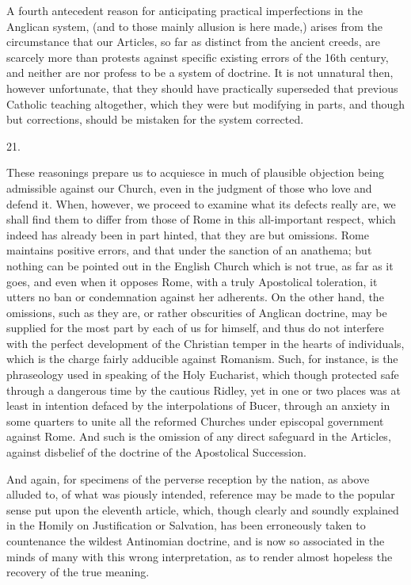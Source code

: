 A fourth antecedent reason for anticipating
practical imperfections in the Anglican system, (and to those mainly
allusion is here made,) arises from the circumstance that our
Articles, so far as distinct from the ancient creeds, are scarcely
more than protests against specific existing errors of the 16th
century, and neither are nor profess to be a system of doctrine. It is
not unnatural then, however unfortunate, that they should have
practically superseded that previous Catholic teaching altogether,
which they were but modifying in parts, and though but corrections,
should be mistaken for the system corrected.

21.

These reasonings prepare us to acquiesce in much
of plausible objection being admissible against our Church, even in
the judgment of those who love and defend it. When, however, we
proceed to examine what its defects really are, we shall find them to
differ from those of Rome in this all-important respect, which indeed
has already been in part hinted, that they are but omissions. Rome
maintains positive errors, and that under the sanction of an anathema;
but nothing can be pointed out in the English Church which is not
true, as far as it goes, and even when it opposes Rome, with a
truly Apostolical toleration, it utters no ban or condemnation against
her adherents. On the other hand, the omissions, such as they are, or
rather obscurities of Anglican doctrine, may be supplied for the most
part by each of us for himself, and thus do not interfere with the
perfect development of the Christian temper in the hearts of
individuals, which is the charge fairly adducible against Romanism.
Such, for instance, is the phraseology used in speaking of the Holy
Eucharist, which though protected safe through a dangerous time by the
cautious Ridley, yet in one or two places was at least in intention
defaced by the interpolations of Bucer, through an anxiety in some
quarters to unite all the reformed Churches under episcopal government
against Rome. And such is the omission of any direct safeguard in the
Articles, against disbelief of the doctrine of the Apostolical
Succession.

And again, for specimens of the perverse
reception by the nation, as above alluded to, of what was piously
intended, reference may be made to the popular sense put upon the
eleventh article, which, though clearly and soundly explained in the
Homily on Justification or Salvation, has been erroneously taken to
countenance the wildest Antinomian doctrine, and is now so associated
in the minds of many with this wrong interpretation, as to render
almost hopeless the recovery of the true meaning.


